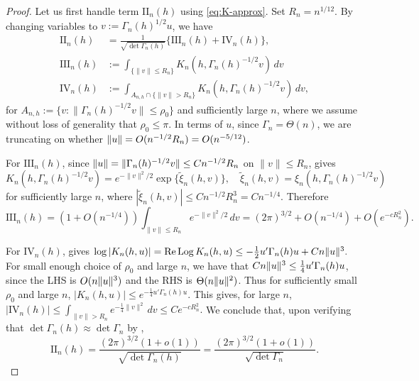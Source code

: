 \documentclass[12pt,reqno]{amsart}
\theoremstyle{theorem}
\theoremstyle{definition}
\newcommand{\0}{\mathbf{0}}
\newcommand{\1}{\mathbf{1}}
\DeclareMathOperator{\Log}{Log} %
\begin{document}
\begin{proof}
Let us first handle term $\mathrm{II}_n(h)$ using \eqref{eq:K-approx}. Set $R_n = n^{1/12}$.
By changing variables to
\(v := \Gamma_n(h)^{1/2} u\),
we have
\begin{align*}
\mathrm{II}_n(h)&=\frac{1}{\sqrt{\det\Gamma_n(h)}}\{\mathrm{III}_n(h)+\mathrm{IV}_n(h)\},\\
\mathrm{III}_n(h)&:=\int_{\{\|v\|\le R_n\}}K_n(h,\Gamma_n(h)^{-1/2}v)\,dv \\
\mathrm{IV}_n(h)&:=\int_{A_{n,h}\cap\{\|v\|>R_n\}}
K_n(h,\Gamma_n(h)^{-1/2}v)\,dv,
\end{align*}
for $A_{n,h}:=\{v:\|\Gamma_n(h)^{-1/2}v\|\le \rho_0\}$ and sufficiently large $n$,
where we assume without loss of generality that $\rho_0 \leq \pi$.
In terms of $u$, since $\Gamma_n
= \Theta(n)$, we are truncating on whether $\lVert u\rVert = O(n^{-1/2} R_n) = O(n^{-5/12})$.


For \(\mathrm{III}_n(h)\), since \(\lVert u\rVert = \|\Gamma_n(h)^{-1/2}v\|\le Cn^{-1/2}R_n\) on
\(\|v\|\le R_n\),
 gives
\[
K_n(h,\Gamma_n(h)^{-1/2}v)
=e^{-\|v\|^2/2}\exp\{\widetilde \xi_n(h,v)\}, \quad \tilde \xi_n(h, v) = \xi_n(h, \Gamma_n(h)^
{-1/2} v)
\]
for sufficiently large $n$,
where
$
|\widetilde \xi_n(h,v)|\le Cn^{-1/2}R_n^3=Cn^{-1/4}.
$
Therefore
\[
\mathrm{III}_n(h)
= (1+O(n^{-1/4})) \int_{\|v\|\le R_n}e^{-\|v\|^2/2}\,dv
=(2\pi)^{3/2}+O(n^{-1/4})+O(e^{-cR_n^2}).
\]

For \(\mathrm{IV}_n(h)\),   gives \(
\log |K_n(h,u)| = \Re \Log K_n(h,u) \le -\frac{1}{2} u' \Gamma_n(h) u + Cn\norm{u}^3.
\)
For small enough choice of $\rho_0$ and large $n$, we have that $C n\lVert u\rVert^3 \le \frac{1}{4} u'
\Gamma_n(h) u$, since the LHS is $O(n \lVert u\rVert^3)$ and the RHS is $\Theta(n \lVert u\rVert^2)$. Thus
for sufficiently small $\rho_0$ and large $n$, $|K_n(h,u)| \le e^{-\frac{1}{4}u' \Gamma_n(h) u}$. This gives, for large $n$,
\(
|\mathrm{IV}_n(h)|
\le
\int_{\|v\|>R_n}e^{-\frac{1}{4} \|v\|^2}\,dv
\le C e^{-c R_n^2}.
\)
We conclude that, upon verifying that $\det \Gamma_n(h) \approx \det \Gamma_n$ by , \[
	\mathrm{II}_n(h) = \frac{(2\pi)^{3/2} (1+o(1))}{\sqrt{\det \Gamma_n(h)}} = \frac{(2\pi)^{3/2}
	(1+o(1))} {\sqrt{\det \Gamma_n}}.
\]


\end{proof}
\end{document}
